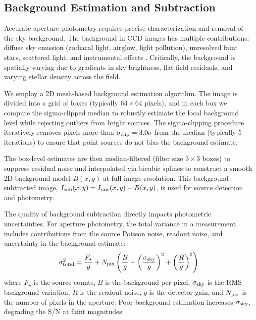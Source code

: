 \documentclass[linenumbers,trackchanges,twocolumn]{aastex701}
\begin{document}
\subsection{Background Estimation and Subtraction} \label{subsec:background}

Accurate aperture photometry requires precise characterization and removal of the sky background. The background in CCD images has multiple contributions: diffuse sky emission (zodiacal light, airglow, light pollution), unresolved faint stars, scattered light, and instrumental effects \citep{bertin1996}. Critically, the background is spatially varying due to gradients in sky brightness, flat-field residuals, and varying stellar density across the field.

We employ a 2D mesh-based background estimation algorithm. The image is divided into a grid of boxes (typically $64 \times 64$ pixels), and in each box we compute the sigma-clipped median to robustly estimate the local background level while rejecting outliers from bright sources. The sigma-clipping procedure iteratively removes pixels more than $\sigma_{\rm clip} = 3.0\sigma$ from the median (typically 5 iterations) to ensure that point sources do not bias the background estimate.

The box-level estimates are then median-filtered (filter size $3 \times 3$ boxes) to suppress residual noise and interpolated via bicubic splines to construct a smooth 2D background model $B(x,y)$ at full image resolution. This background-subtracted image, $I_{\rm sub}(x,y) = I_{\rm raw}(x,y) - B(x,y)$, is used for source detection and photometry.

The quality of background subtraction directly impacts photometric uncertainties. For aperture photometry, the total variance in a measurement includes contributions from the source Poisson noise, readout noise, and uncertainty in the background estimate:
\begin{equation}
\sigma_{\rm total}^2 = \frac{F_\star}{g} + N_{\rm pix}\left(\frac{B}{g} + \left(\frac{\sigma_{\rm sky}}{g}\right)^2 + \left(\frac{R}{g}\right)^2\right)
\label{eq:phot_uncertainty}
\end{equation}
where $F_\star$ is the source counts, $B$ is the background per pixel, $\sigma_{\rm sky}$ is the RMS background variation, $R$ is the readout noise, $g$ is the detector gain, and $N_{\rm pix}$ is the number of pixels in the aperture. Poor background estimation increases $\sigma_{\rm sky}$, degrading the S/N at faint magnitudes.
\end{document}
